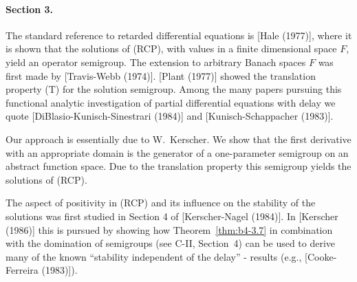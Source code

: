 \paragraph{Section 3.} The standard reference to retarded differential equations is [Hale (1977)], where it is shown that the solutions of (RCP), with values in a finite dimensional space $F$, yield an operator semigroup. The extension to arbitrary Banach spaces $F$ was first made by [Travis-Webb (1974)]. [Plant (1977)] showed the translation property (T) for the solution semigroup. 
Among the many papers pursuing this functional analytic investigation of partial differential equations with delay we quote [DiBlasio-Kunisch-Sinestrari (1984)] and [Kunisch-Schappacher (1983)].

Our approach is essentially due to W.~Kerscher. We show that the first derivative with an appropriate domain is the generator of a one-parameter semigroup on an abstract function space. Due to the translation property this semigroup yields the solutions of (RCP).

The aspect of positivity in (RCP) and its influence on the stability of the solutions was first studied in Section 4 of [Kerscher-Nagel (1984)]. In [Kerscher (1986)] this is pursued by showing how Theorem~\ref{thm:b4-3.7} in combination with the domination of semigroups (see C-II, Section~4) can be used to derive many of the known \enquote{stability independent of the delay} - results (e.g., [Cooke-Ferreira (1983)]).







